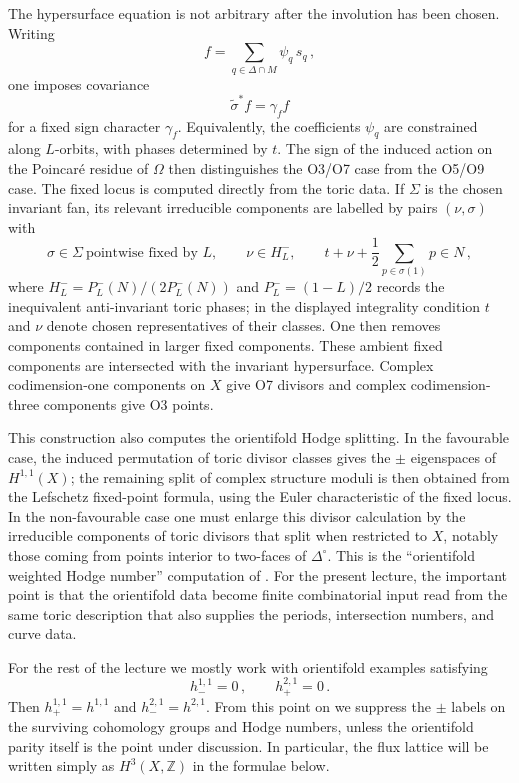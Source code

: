 The hypersurface equation is not arbitrary after the involution has
been chosen.  Writing
\begin{equation}
    f=\sum_{q\in\Delta\cap M}\psi_q\,s_q\, ,
\end{equation}
one imposes covariance
\begin{equation}
    \widetilde\sigma^*f=\gamma_f f
\end{equation}
for a fixed sign character $\gamma_f$.  Equivalently, the
coefficients $\psi_q$ are constrained along $L$-orbits, with phases
determined by $t$.  The sign of the induced action on the
Poincar\'e residue of $\Omega$ then distinguishes the O3/O7 case
from the O5/O9 case.  The fixed locus is computed directly from the
toric data.  If $\Sigma$ is the chosen invariant fan, its relevant
irreducible components are labelled by pairs $(\nu,\sigma)$ with
\begin{equation}
    \sigma\in\Sigma\ \text{pointwise fixed by }L,\qquad
    \nu\in H^-_L,\qquad
    t+\nu+\frac12\sum_{p\in\sigma(1)}p\in N\, ,
\end{equation}
where $H^-_L=P^-_L(N)/(2P^-_L(N))$ and
$P^-_L=(1-L)/2$ records the inequivalent anti-invariant toric
phases; in the displayed integrality condition $t$ and $\nu$ denote
chosen representatives of their classes.  One then removes
components contained in larger fixed components.  These ambient
fixed components are intersected with the invariant hypersurface.
Complex codimension-one components on $X$ give O7 divisors and
complex codimension-three components give O3 points.

This construction also computes the orientifold Hodge splitting.  In
the favourable case, the induced permutation of toric divisor
classes gives the $\pm$ eigenspaces of $H^{1,1}(X)$; the remaining
split of complex structure moduli is then obtained from the
Lefschetz fixed-point formula, using the Euler
characteristic of the fixed locus.  In the non-favourable case one
must enlarge this divisor calculation by the irreducible components
of toric divisors that split when restricted to $X$, notably those
coming from points interior to two-faces of $\Delta^\circ$.  This is
the ``orientifold weighted Hodge number'' computation of
\cite{Moritz:2023jdb}.  For the present lecture, the important
point is that the orientifold data become finite combinatorial input
read from the same toric description that also supplies the periods,
intersection numbers, and curve data.



For the rest of the lecture we mostly work with orientifold examples
satisfying
\begin{equation}
    h^{1,1}_{-}=0\, ,
    \qquad
    h^{2,1}_{+}=0\, .
\end{equation}
Then $h^{1,1}_{+}=h^{1,1}$ and $h^{2,1}_{-}=h^{2,1}$.  From this
point on we suppress the $\pm$ labels on the surviving cohomology
groups and Hodge numbers, unless the orientifold parity itself is the
point under discussion.  In particular, the flux lattice will be
written simply as $H^3(X,\mathbb Z)$ in the formulae below.






